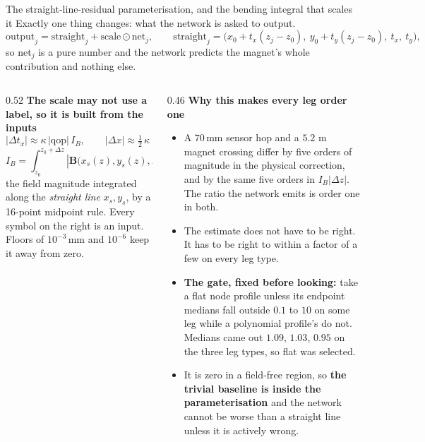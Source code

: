 \documentclass[aspectratio=169,10pt]{beamer}
\newcommand{\mm}{\ensuremath{\,\mathrm{mm}}}
\newcommand{\qop}{\ensuremath{\mathrm{qop}}}
\newcommand{\hl}[1]{{\color{accent}\textbf{#1}}}
\begin{document}
\begin{frame}[shrink=25]{The straight-line-residual parameterisation, and the bending integral that scales it}
  \vspace{1mm}
  Exactly one thing changes: what the network is asked to output.
  \[ \mathrm{output}_j = \mathrm{straight}_j + \mathrm{scale} \odot \mathrm{net}_j,
     \qquad
     \mathrm{straight}_j = \big(x_0 + t_x (z_j - z_0),\ y_0 + t_y (z_j - z_0),\ t_x,\ t_y\big), \]
  so $\mathrm{net}_j$ is a pure number and the network predicts the magnet's
  whole contribution and nothing else.
  \vspace{-1mm}
  \begin{columns}[T]
    \begin{column}{0.52\textwidth}
      \textbf{The scale may not use a label, so it is built from the inputs}
      \[ |\Delta t_x| \approx \kappa\,|\qop|\,I_B,
         \qquad
         |\Delta x| \approx \tfrac12\,\kappa\,|\qop|\,I_B\,|\Delta z|, \]
      \[ I_B = \int_{z_0}^{z_0 + \Delta z}
               \left|\mathbf{B}\big(x_s(z), y_s(z), z\big)\right| \mathrm{d}z
         \quad [\mathrm{T}\,\mathrm{mm}], \]
      the field magnitude integrated along the \emph{straight line}
      $x_s, y_s$, by a 16-point midpoint rule. Every symbol on the right is an
      input. Floors of $10^{-3}\mm$ and $10^{-6}$ keep it away from zero.
    \end{column}
    \begin{column}{0.46\textwidth}
      \textbf{Why this makes every leg order one}
      \begin{itemize}\small
        \item A $70\mm$ sensor hop and a $5.2$ m magnet crossing differ by five
              orders of magnitude in the physical correction, and by the same
              five orders in $I_B |\Delta z|$. The ratio the network emits is
              order one in both.
        \item The estimate does not have to be right. It has to be right to
              within a factor of a few on every leg type.
        \item \hl{The gate, fixed before looking:} take a flat node profile
              unless its endpoint medians fall outside $0.1$ to $10$ on some leg
              while a polynomial profile's do not. Medians came out $1.09$,
              $1.03$, $0.95$ on the three leg types, so flat was selected.
        \item It is zero in a field-free region, so \hl{the trivial baseline is
              inside the parameterisation} and the network cannot be worse than
              a straight line unless it is actively wrong.
      \end{itemize}
    \end{column}
  \end{columns}
\end{frame}
\end{document}
